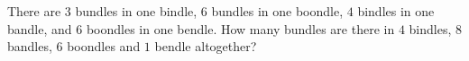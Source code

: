 There are $3$ bundles in one bindle, $6$ bundles in one boondle, $4$ bindles in one bandle, and $6$ boondles in one bendle. How many bundles are there in $4$ bindles, $8$ bandles, $6$ boondles and $1$ bendle altogether?
